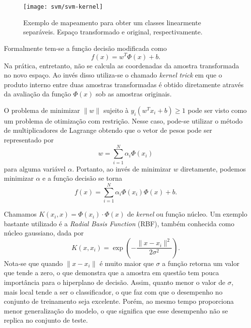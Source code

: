 \begin{figure}
\centering
\texttt{[image: svm/svm-kernel]}
\caption{Exemplo de mapeamento para obter um classes linearmente separáveis. Espaço transformado e original, respectivamente.}
\label{fig:svm-kernel}
\end{figure}

Formalmente \cite{bishop2007} tem-se a função decisão modificada como
\begin{equation*}
f(x)=w^T \Phi(x) +b.
\end{equation*}
Na prática, entretanto, não se calcula as coordenadas da amostra transformada no novo espaço. Ao invés disso utiliza-se o chamado \textit{kernel trick} \cite{bishop2007} em que o produto interno entre duas amostras transformadas é obtido diretamente através da avaliação da função $\Phi(x)$ sob as amostras originais.

O problema de minimizar $\|w\|$ sujeito à $y_i(w^T x_i+b) \geq 1$ pode ser visto como um problema de otimização com restrição. Nesse caso, pode-se utilizar o método de multiplicadores de Lagrange \cite{bishop2007} obtendo que o vetor de pesos pode ser representado por
\begin{equation}
	\label{eq:teo-kimeldorf}
	w=\sum_{i=1}^N \alpha_i \Phi(x_i)
\end{equation}
para alguma variável $\alpha$. Portanto, ao invés de minimizar $w$ diretamente, podemos minimizar $\alpha$ e a função decisão se torna
\begin{equation}
	\label{eq:svm-decision-func}
	f(x)=\sum_{i=1}^N \alpha_i \Phi(x_i) \Phi(x) +b.
\end{equation}

Chamamos $K(x_i, x) = \Phi(x_i) \cdot \Phi(x)$ de \textit{kernel} ou função núcleo. Um exemplo bastante utilizado é a \textit{Radial Basis Function} (RBF), também conhecida como núcleo gaussiano, dada por
\begin{equation}
	\label{eq:svm-kernel-func}
	K(x,x_i) = \exp\left(-\frac{\|x-x_i\|^2}{2\sigma^2}\right).
\end{equation}
Nota-se que quando $\|x-x_i\|$ é muito maior que $\sigma$ a função retorna um valor que tende a zero, o que demonstra que a amostra em questão tem pouca importância para o hiperplano de decisão. Assim, quanto menor o valor de $\sigma$, mais local tende a ser o classificador, o que faz com que o desempenho no conjunto de treinamento seja excelente. Porém, ao mesmo tempo proporciona menor generalização do modelo, o que significa que esse desempenho não se replica no conjunto de teste.


